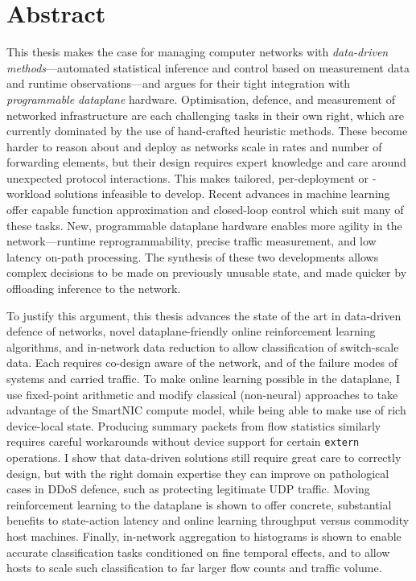 \chapter*{Abstract}

This thesis makes the case for managing computer networks with \emph{data-driven methods}---automated statistical inference and control based on measurement data and runtime observations---and argues for their tight integration with \emph{programmable dataplane} hardware.
Optimisation, defence, and measurement of networked infrastructure are each challenging tasks in their own right, which are currently dominated by the use of hand-crafted heuristic methods.
These become harder to reason about and deploy as networks scale in rates and number of forwarding elements, but their design requires expert knowledge and care around unexpected protocol interactions.
This makes tailored, per-deployment or -workload solutions infeasible to develop.
Recent advances in machine learning offer capable function approximation and closed-loop control which suit many of these tasks.
New, programmable dataplane hardware enables more agility in the network---runtime reprogrammability, precise traffic measurement, and low latency on-path processing.
The synthesis of these two developments allows complex decisions to be made on previously unusable state, and made quicker by offloading inference to the network.

To justify this argument, this thesis advances the state of the art in data-driven defence of networks, novel dataplane-friendly online reinforcement learning algorithms, and in-network data reduction to allow classification of switch-scale data.
Each requires co-design aware of the network, and of the failure modes of systems and carried traffic.
To make online learning possible in the dataplane, I use fixed-point arithmetic and modify classical (non-neural) approaches to take advantage of the SmartNIC compute model, while being able to make use of rich device-local state.
Producing summary packets from flow statistics similarly requires careful workarounds without device support for certain \texttt{extern} operations.
I show that data-driven solutions still require great care to correctly design, but with the right domain expertise they can improve on pathological cases in DDoS defence, such as protecting legitimate UDP traffic.
Moving reinforcement learning to the dataplane is shown to offer concrete, substantial benefits to state-action latency and online learning throughput versus commodity host machines.
Finally, in-network aggregation to histograms is shown to enable accurate classification tasks conditioned on fine temporal effects, and to allow hosts to scale such classification to far larger flow counts and traffic volume.


